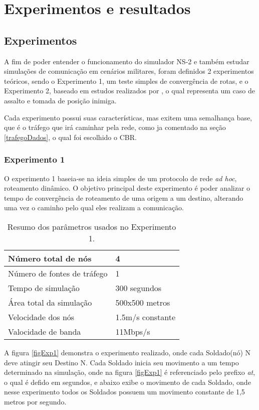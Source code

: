 \section{Experimentos e resultados}
\subsection{Experimentos}
A fim de poder entender o funcionamento do simulador NS-2 e tamb\'em estudar simula\c{c}\~oes de comunica\c{c}\~ao em cen\'arios militares, foram definidos 2 experimentos te\'oricos, sendo o Experimento 1, um teste simples de converg\^encia de rotas, e o Experimento 2, baseado em estudos realizados por \cite{pereira}, o qual representa um caso de assalto e tomada de posi\c{c}\~ao inimiga.

Cada experimento possui suas caracter\'isticas, mas exitem uma semalhan\c{c}a base, que \'e o tr\'afego que ir\'a caminhar pela rede, como ja comentado na se\c{c}\~ao \ref{trafegoDados}, o qual foi escolhido o CBR.

\subsubsection{Experimento 1}
O experimento 1 baseia-se na ideia simples de um protocolo de rede \textit{ad hoc}, roteamento din\^amico.
O objetivo principal deste experimento \'e poder analizar o tempo de converg\^encia de roteamento de uma origem a um destino, alterando uma vez o caminho pelo qual eles realizam a comunica\c{c}\~ao.

\begin{table}[H]
	\centering
	\caption{Resumo dos par\^ametros usados no Experimento 1.}
	\begin{tabular}{ | l | l | }
		\hline
		N\'umero total de n\'os & 4 \\ \hline
		N\'umero de fontes de tr\'afego & 1 \\ \hline
		Tempo de simula\c{c}\~ao & 300 segundos \\ \hline
		\'Area total da simula\c{c}\~ao & 500x500 metros \\ \hline
		Velocidade dos n\'os & 1.5m/s constante \\ \hline
		Valocidade de banda & 11Mbps/s \\ \hline
	\end{tabular}
	\label{tabParamExp1}
\end{table}

A figura \ref{figExp1} demonstra o experimento realizado, onde cada Soldado(n\'o) N deve atingir seu Destino N.
Cada Soldado inicia seu movimento a um tempo determinado na simula\c{c}\~ao, onde na figura \ref{figExp1} \'e referenciado pelo prefixo \textit{at}, o qual \'e defido em segundos, e abaixo exibe o movimento de cada Soldado, onde nesse experimento todos os Soldados possuem um movimento constante de 1,5 metros por segundo. 

